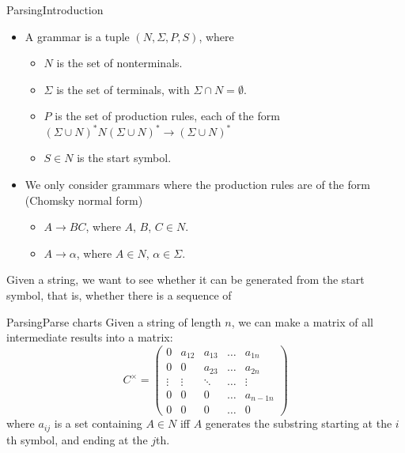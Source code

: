 \documentclass[14pt, notes=hide]{beamer}
\newcommand{\trc}[1]{#1^{\times}}
\begin{document}
\begin{frame}{Parsing}{Introduction} %
\begin{itemize}
\item A grammar is a tuple $(N, \Sigma, P, S)$, where
  \begin{itemize}
  \item $N$ is the set of nonterminals.
  \item $\Sigma$ is the set of terminals, with $\Sigma \cap N = \emptyset$.
  \item $P$ is the set of production rules, each of the form $(\Sigma \cup N)^*N(\Sigma \cup N)^* \to (\Sigma \cup N)^*$
  \item $S \in N$ is the start symbol.
  \end{itemize}
\pause
\item We only consider grammars where the production rules are of the form (Chomsky normal form)
  \begin{itemize}
  \item $A \to BC$, where $A$, $B$, $C \in N$.
  \item $A \to \alpha$, where $A \in N$, $\alpha \in \Sigma$.
  \end{itemize}
\end{itemize}
\pause
Given a string, we want to see whether it can be generated from the start symbol, that is, whether there is a sequence of 
\end{frame}

\begin{frame}{Parsing}{Parse charts}
  Given a string of length $n$, we can make a matrix of all intermediate results into a matrix:
  \begin{equation*}
    \trc{C} = \begin{pmatrix}
      0 & a_{1 2} & a_{1 3} & \hdots & a_{1 n} \\
      0 & 0      & a_{2 3}  & \ldots & a_{2 n} \\
      \vdots & \vdots &\ddots & \ldots & \vdots\\
      0      & 0      & 0      & \ldots &a_{n-1 n}\\
      0      & 0      & 0      & \ldots &0
    \end{pmatrix}
  \end{equation*}
  where $a_{i j}$ is a set containing $A \in N$ iff $A$ generates the substring starting at the $i$th symbol, and ending at the $j$th.
\end{frame}
\end{document}
